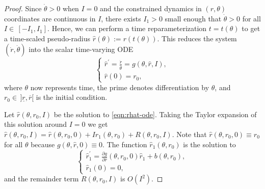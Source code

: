 \documentclass[journal,twoside,web, onecolumn, draftcls]{ieeecolor}
\begin{document}
\begin{proof}
    Since \(\dot{\theta} > 0\) when \(I = 0\) and the constrained dynamics 
    in \((r,\theta)\) coordinates are continuous in \(I\), there exists 
    \(I_1 > 0\) small enough that \(\dot{\theta} > 0\) for all
    \(I \in \, [-I_1,I_1]\).
    Hence, we can perform a time reparameterization \(t = t(\theta)\) to get a
    time-scaled pseudo-radius \(\hat{r}(\theta) := r(t(\theta))\).
    This reduces the system \((\dot{r},\dot{\theta})\) into the scalar
    time-varying ODE 
    \begin{equation}\label{eqn:rhat-ode}
        \begin{cases}
            \hat{r}^\prime= \frac{\dot{r}}{\dot{\theta}} =
            g(\theta,\hat{r},I)
            , \\
            \hat{r}(0) = r_0
            ,
        \end{cases}
    \end{equation}
    where \(\theta\) now represents time,
    the prime denotes differentiation by \(\theta\), and
    \(r_0 \in \, ]\underline{r},\overline{r}[\) is the initial condition.

    Let \(\hat{r}(\theta,r_0,I)\) be the solution to \eqref{eqn:rhat-ode}.
    Taking the Taylor expansion of this solution around \(I = 0\) we get
    \(\hat{r}(\theta,r_0,I) = \hat{r}(\theta,r_0,0) + I\hat{r}_1(\theta,r_0) 
    + R(\theta,r_0,I)\). 
    Note that \(\hat{r}(\theta,r_0,0) \equiv r_0\) for all \(\theta\) because
    \(g(\theta,\hat{r},0) \equiv 0\).
    The function \(\hat{r}_1(\theta,r_0)\) is the solution to
    \begin{equation}\label{eqn:r1-hat-prime}
        \begin{cases}
        \hat{r}_1^\prime = 
        \frac{\partial g}{\partial \hat{r}}(\theta,r_0,0)\hat{r}_1 +
        b(\theta,r_0)
        , \\
        \hat{r}_1(0) = 0
        ,
    \end{cases}
    \end{equation}
    and the remainder term \(R(\theta,r_0,I)\) is \(O(I^2)\).


\end{proof}
\end{document}
